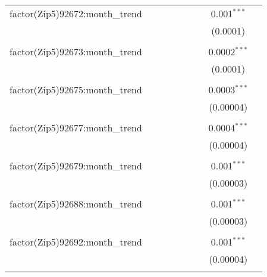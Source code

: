 \begin{table}[H]
{\begin{tabular}{@{\extracolsep{5pt}}lcccccccc}
  factor(Zip5)92672:month\_trend &  &  &  &  &  &  & 0.001$^{***}$ &  \\  

   &  &  &  &  &  &  & (0.0001) &  \\  

   & & & & & & & & \\  

  factor(Zip5)92673:month\_trend &  &  &  &  &  &  & 0.0002$^{***}$ &  \\  

   &  &  &  &  &  &  & (0.0001) &  \\  

   & & & & & & & & \\  

  factor(Zip5)92675:month\_trend &  &  &  &  &  &  & 0.0003$^{***}$ &  \\  

   &  &  &  &  &  &  & (0.00004) &  \\  

   & & & & & & & & \\  

  factor(Zip5)92677:month\_trend &  &  &  &  &  &  & 0.0004$^{***}$ &  \\  

   &  &  &  &  &  &  & (0.00004) &  \\  

   & & & & & & & & \\  

  factor(Zip5)92679:month\_trend &  &  &  &  &  &  & 0.001$^{***}$ &  \\  

   &  &  &  &  &  &  & (0.00003) &  \\  

   & & & & & & & & \\  

  factor(Zip5)92688:month\_trend &  &  &  &  &  &  & 0.001$^{***}$ &  \\  

   &  &  &  &  &  &  & (0.00003) &  \\  

   & & & & & & & & \\  

  factor(Zip5)92692:month\_trend &  &  &  &  &  &  & 0.001$^{***}$ &  \\  

   &  &  &  &  &  &  & (0.00004) &  \\  

   & & & & & & & & \\  


\end{tabular}}
\end{table}
